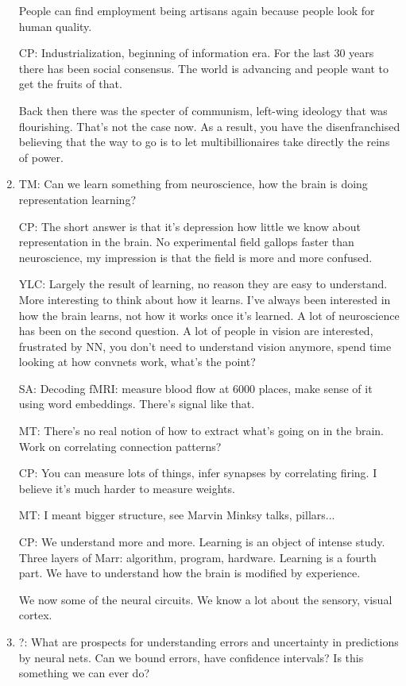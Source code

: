 \begin{enumerate}
People can find employment being artisans again because people look for human quality.

CP: Industrialization, beginning of information era. For the last 30 years there has been social consensus. The world is advancing and people want to get the fruits of that.

Back then there was the specter of communism, left-wing ideology that was flourishing. That's not the case now. As a result, you have the disenfranchised believing that the way to go is to let multibillionaires take directly the reins of power.
\item
TM: Can we learn something from neuroscience, how the brain is doing representation learning?

CP: The short answer is that it's depression how little we know about representation in the brain. No experimental field gallops faster than neuroscience, my impression is that the field is more and more confused.

YLC: Largely the result of learning, no reason they are easy to understand. More interesting to think about how it learns. I've always been interested in how the brain learns, not how it works once it's learned. A lot of neuroscience has been on the second question. A lot of people in vision are interested, frustrated by NN, you don't need to understand vision anymore, spend time looking at how convnets work, what's the point?

SA: Decoding fMRI: measure blood flow at 6000 places, make sense of it using word embeddings. There's signal like that.

MT: There's no real notion of how to extract what's going on in the brain. Work on correlating connection patterns?

CP: You can measure lots of things, infer synapses by correlating firing. I believe it's much harder to measure weights. 

MT: I meant bigger structure, see Marvin Minksy talks, pillars...

CP: We understand more and more. Learning is an object of intense study. Three layers of Marr: algorithm, program, hardware. Learning is a fourth part. We have to understand how the brain is modified by experience.

We now some of the neural circuits. We know a lot about the sensory, visual cortex.
\item
?: What are prospects for understanding errors and uncertainty in predictions by %
neural nets. Can we bound errors, have confidence intervals? Is this something we can ever do?


\end{enumerate}
